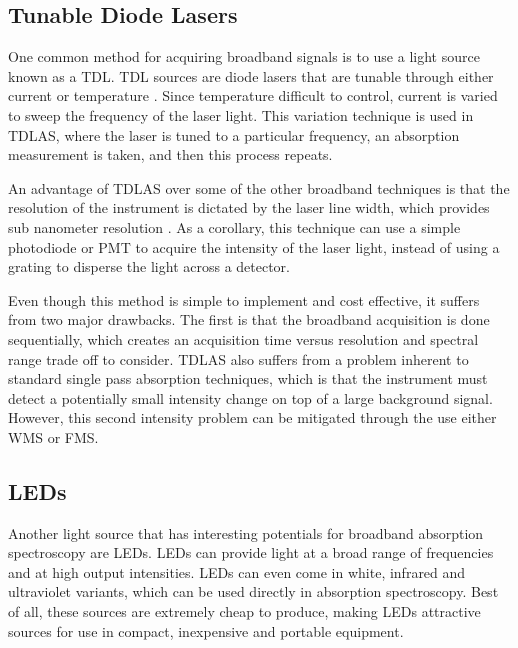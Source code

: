 \subsection{Tunable Diode Lasers}\label{subsec:tdl}

One common method for acquiring broadband signals is to use a light source
known as a \acf{TDL}. \ac{TDL} sources are diode lasers that are tunable
through either current or temperature \cite{May:1998ue}. Since temperature
difficult to control, current is varied to sweep the frequency of the laser
light. This variation technique is used in \ac{TDLAS}, where the laser is tuned
to a particular frequency, an absorption measurement is taken, and then this
process repeats.

An advantage of \ac{TDLAS} over some of the other broadband techniques is that
the resolution of the instrument is dictated by the laser line width, which
provides sub nanometer resolution \cite{Berden:2009wk}. As a corollary, this
technique can use a simple photodiode or \ac{PMT} to acquire the intensity of
the laser light, instead of using a grating to disperse the light across a
detector.

Even though this method is simple to implement and cost effective, it suffers
from two major drawbacks. The first is that the broadband acquisition is done
sequentially, which creates an acquisition time versus resolution and spectral
range trade off to consider. \ac{TDLAS} also suffers from a problem inherent
to standard single pass absorption techniques, which is that the instrument
must detect a potentially small intensity change on top of a large background
signal. However, this second intensity problem can be mitigated through the use
either \ac{WMS} \cite{Reid:1981vq} or \ac{FMS}.



\subsection{LEDs}\label{subsec:led}

Another light source that has interesting potentials for broadband absorption
spectroscopy are \acp{LED}. \acp{LED} can provide light at a broad range of
frequencies and at high output intensities. \acp{LED} can even come in white,
infrared and ultraviolet variants, which can be used directly in absorption
spectroscopy. Best of all, these sources are extremely cheap to produce, making
\acp{LED} attractive sources for use in compact, inexpensive and portable
equipment.

